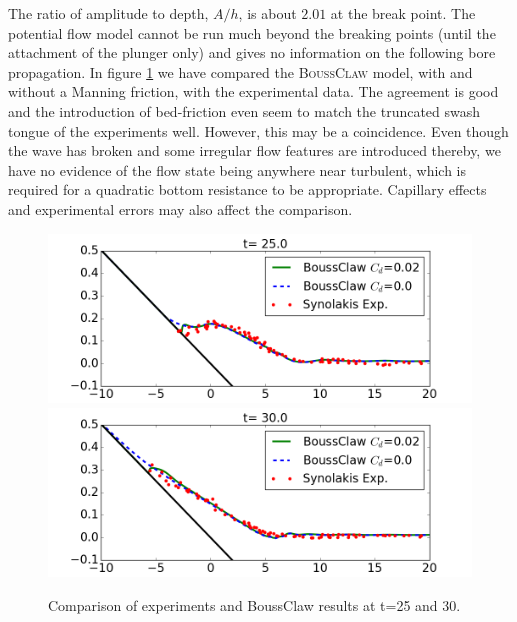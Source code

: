 \documentclass[review]{elsarticle}
\newcommand{\BoussClaw}{\textsc{BoussClaw} }
\begin{document}
The ratio of amplitude to depth, $A/h$, 
is about $2.01$ at the break point.
The potential flow model cannot be run much beyond the
breaking points (until the attachment of the plunger only) and 
gives no information on the following bore propagation.
In figure \ref{fig:BoussClaw_runup} we have compared the \BoussClaw model, with and without 
a Manning friction, with the experimental data. The agreement is good and the introduction of bed-friction 
even seem to match the truncated swash tongue of the experiments well. However, this may be a coincidence. Even though
the  wave has broken and some irregular flow features are introduced thereby, we have no evidence of the flow state being
anywhere near turbulent, which is required for a quadratic bottom resistance to be appropriate. Capillary effects and 
experimental errors may also affect the comparison.
\begin{figure}[tbh!]
	\centering
	\includegraphics[width=.45\textwidth]{_fig/BoussClaw_lab_Cd_t25}
	\includegraphics[width=.45\textwidth]{_fig/BoussClaw_lab_Cd_t30}
	\caption{Comparison of experiments and BoussClaw results 
		at t=25 and 30.}
	\label{fig:BoussClaw_runup}
\end{figure}





\end{document}
